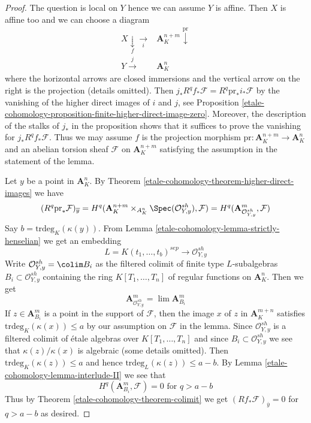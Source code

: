 \begin{proof}
The question is local on $Y$ hence we can assume $Y$ is affine.
Then $X$ is affine too and we can choose a diagram
$$
\begin{array}{cc}X \underset{f}{\downarrow}\underset{i}{\longrightarrow} & \mathbf{A}^{n + m}_K \overset{\text{pr}}{\downarrow} \\ Y \overset{j}{\longrightarrow} & \mathbf{A}^n_K\end{array}
$$
where the horizontal arrows are closed immersions and the vertical
arrow on the right is the projection (details omitted).
Then $j_*R^qf_*\mathcal{F} = R^q\text{pr}_*i_*\mathcal{F}$
by the vanishing of the higher direct images of $i$ and $j$, see
Proposition \ref{etale-cohomology-proposition-finite-higher-direct-image-zero}.
Moreover, the description of the stalks of $j_*$ in the proposition
shows that it suffices to prove the vanishing for $j_*R^qf_*\mathcal{F}$.
Thus we may assume $f$ is the projection
morphism $\text{pr} : \mathbf{A}^{n + m}_K \to \mathbf{A}^n_K$
and an abelian torsion sheaf $\mathcal{F}$ on $\mathbf{A}^{n + m}_K$
satisfying the assumption in the statement of the lemma.

\medskip\noindent
Let $y$ be a point in $\mathbf{A}^n_K$.
By Theorem \ref{etale-cohomology-theorem-higher-direct-images} we have
$$
(R^q\text{pr}_*\mathcal{F})_{\overline{y}} =
H^q(\mathbf{A}^{n + m}_K \times_{A^n_K} \Spec(\mathcal{O}_{Y, y}^{sh}),
\mathcal{F}) =
H^q(\mathbf{A}^m_{\mathcal{O}_{Y, y}^{sh}}, \mathcal{F})
$$
Say $b = \text{trdeg}_K(\kappa(y))$. From Lemma \ref{etale-cohomology-lemma-strictly-henselian}
we get an embedding
$$
L = K(t_1, \ldots, t_b)^{sep} \longrightarrow \mathcal{O}_{Y, y}^{sh}
$$
Write $\mathcal{O}_{Y, y}^{sh} = \colim B_i$ as the filtered
colimit of finite type $L$-subalgebras $B_i \subset \mathcal{O}_{Y, y}^{sh}$
containing the ring $K[T_1, \ldots, T_n]$ of regular functions
on $\mathbf{A}^n_K$. Then we get
$$
\mathbf{A}^m_{\mathcal{O}_{Y, y}^{sh}} =
\lim \mathbf{A}^m_{B_i}
$$
If $z \in \mathbf{A}^m_{B_i}$ is a point in the support of
$\mathcal{F}$, then the image $x$ of $z$ in $\mathbf{A}^{m + n}_K$
satisfies $\text{trdeg}_K(\kappa(x)) \leq a$ by our assumption on
$\mathcal{F}$ in the lemma.
Since $\mathcal{O}_{Y, y}^{sh}$ is a filtered colimit of
\'etale algebras over $K[T_1, \ldots, T_n]$ and since
$B_i \subset \mathcal{O}_{Y, y}^{sh}$
we see that $\kappa(z)/\kappa(x)$ is algebraic
(some details omitted). Then $\text{trdeg}_K(\kappa(z)) \leq a$
and hence $\text{trdeg}_L(\kappa(z)) \leq a - b$.
By Lemma \ref{etale-cohomology-lemma-interlude-II} we see that
$$
H^q(\mathbf{A}^m_{B_i}, \mathcal{F}) = 0\text{ for }q > a - b
$$
Thus by Theorem \ref{etale-cohomology-theorem-colimit} we get
$(Rf_*\mathcal{F})_{\overline{y}} = 0$ for $q > a - b$
as desired.
\end{proof}

